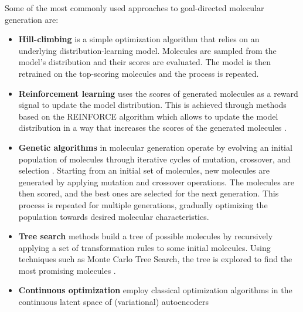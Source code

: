 Some of the most commonly used approaches to goal-directed molecular generation are:
\begin{itemize}
      \item \textbf{Hill-climbing}
            \citep{seglerGeneratingFocusedMolecule2018,xieMARSMarkovMolecular2021,thomasAugmentedHillClimbIncreases2022}
            is a simple optimization algorithm that relies on an underlying distribution-learning model.
            Molecules are sampled from the model's distribution and their scores are evaluated.
            The model is then retrained on the top-scoring molecules and the process is repeated.
      \item \textbf{Reinforcement learning} uses the scores of generated molecules as a reward signal to update
            the model distribution. This is achieved through methods based on the REINFORCE algorithm
            \citep{williamsSimpleStatisticalGradientfollowing1992} which allows to update the model
            distribution in a way that increases the scores of the generated molecules
            \citep{olivecronaMolecularDenovoDesign2017,thomasAugmentedHillClimbIncreases2022,youGraphConvolutionalPolicy2019,guoAugmentedMemoryCapitalizing2023}.
      \item \textbf{Genetic algorithms} in molecular generation operate by evolving an initial
            population of molecules through iterative cycles of mutation, crossover, and selection
            \citep{jensenGraphbasedGeneticAlgorithm2019,nigamGenerativeModelsSuperfast2021,yoshikawaPopulationbasedNovoMolecule2018}.
            Starting from an initial set of molecules, new molecules are generated by applying
            mutation and crossover operations. The molecules are then scored, and the best ones are
            selected for the next generation. This process is repeated for multiple generations,
            gradually optimizing the population towards desired molecular characteristics.
      \item \textbf{Tree search} methods build a tree of possible molecules by recursively applying a set of transformation rules
            to some initial molecules. Using techniques such as Monte Carlo Tree Search, the tree is
            explored to find the most promising molecules \citep{yangChemTSEfficientPython2017,jensenGraphbasedGeneticAlgorithm2019}.
      \item \textbf{Continuous optimization} employ classical optimization algorithms in the continuous
            latent space of (variational) autoencoders
            \citep{gomez-bombarelliAutomaticChemicalDesign2018,kusnerGrammarVariationalAutoencoder2017,winterEfficientMultiobjectiveMolecular2019}

\end{itemize}
